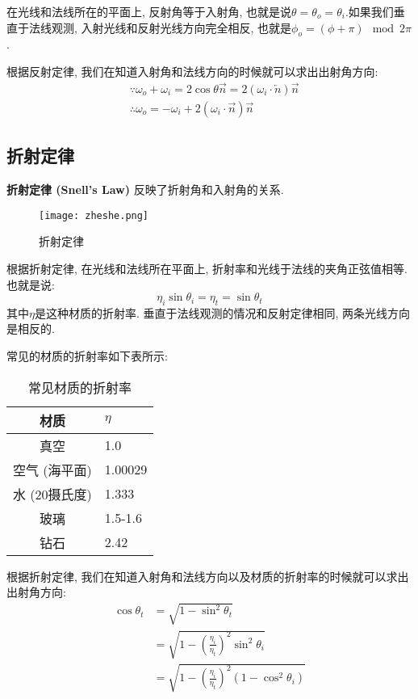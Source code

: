在光线和法线所在的平面上, 反射角等于入射角, 也就是说$\theta=\theta_o=\theta_i$.如果我们垂直于法线观测, 入射光线和反射光线方向完全相反, 也就是$\phi_o=(\phi+\pi)\mod 2\pi$.

根据反射定律, 我们在知道入射角和法线方向的时候就可以求出出射角方向: 
\begin{equation}
	\begin{split}
		&\because \omega_o + \omega_i = 2\cos\theta \overrightarrow{n} = 2(\omega_i\cdot \overleftarrow{n})\overrightarrow{n}\\
		&\therefore \omega_o = -\omega_i + 2(\omega_i\cdot \overrightarrow{n})\overrightarrow{n}
	\end{split}
\end{equation}

\subsection{折射定律}

\textbf{折射定律 (Snell's Law) }反映了折射角和入射角的关系. 

\begin{figure}[H]
	\centering
	\texttt{[image: zheshe.png]}
	\caption{折射定律}
	\label{fig:zheshe}
\end{figure}

根据折射定律, 在光线和法线所在平面上, 折射率和光线于法线的夹角正弦值相等. 也就是说: 
\begin{equation}
	\eta_i\sin\theta_i = \eta_t=\sin\theta_t
\end{equation}
其中$\eta$是这种材质的折射率. 垂直于法线观测的情况和反射定律相同, 两条光线方向是相反的. 

常见的材质的折射率如下表所示: 

\begin{table}[H]
	\centering
	\begin{tabular}{cl}
		\hline
		材质       & $\eta$  \\ \hline
		真空       & 1.0     \\
		空气 (海平面)   & 1.00029 \\
		水 (20摄氏度)  & 1.333   \\
		玻璃       & 1.5-1.6 \\
		钻石       & 2.42  \\ \hline
	\end{tabular}
	\caption{常见材质的折射率}
\end{table}

根据折射定律, 我们在知道入射角和法线方向以及材质的折射率的时候就可以求出出射角方向: 
\begin{equation}
	\begin{split}
		\cos\theta_t&=\sqrt{1-\sin^2\theta_t}\\
		&=\sqrt{1-(\frac{\eta_i}{\eta_t})^2\sin^2\theta_i}\\
		&=\sqrt{1-(\frac{\eta_i}{\eta_t})^2(1-\cos^2\theta_i)}
	\end{split}
\end{equation}

